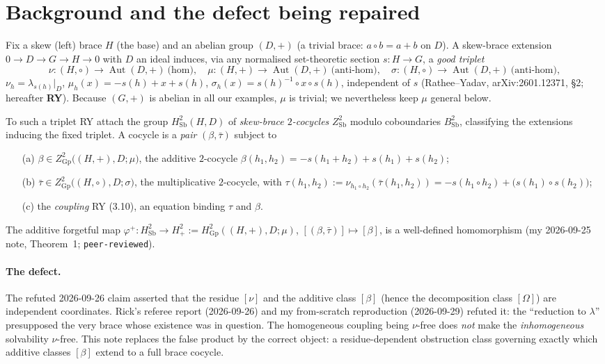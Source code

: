 \documentclass[11pt]{article}
\theoremstyle{definition}
\newcommand{\Sb}{\mathrm{Sb}}
\newcommand{\Gp}{\mathrm{Gp}}
\newcommand{\Aut}{\operatorname{Aut}}
\begin{document}
\section{Background and the defect being repaired}\label{sec:setup}

Fix a skew (left) brace $H$ (the base) and an abelian group $(D,+)$ (a trivial brace:
$a\circ b=a+b$ on $D$). A skew-brace extension $0\to D\to G\to H\to 0$ with $D$ an ideal
induces, via any normalised set-theoretic section $s:H\to G$, a \emph{good triplet}
\[
\nu:(H,\circ)\to\Aut(D,+)\ \text{(hom)},\quad
\mu:(H,+)\to\Aut(D,+)\ \text{(anti-hom)},\quad
\sigma:(H,\circ)\to\Aut(D,+)\ \text{(anti-hom)},
\]
$\nu_h=\lambda_{s(h)}|_D$, $\mu_h(x)=-s(h)+x+s(h)$, $\sigma_h(x)=s(h)^{-1}\circ x\circ s(h)$,
independent of $s$ (Rathee--Yadav, arXiv:2601.12371, \S2; hereafter \textbf{RY}). Because
$(G,+)$ is abelian in all our examples, $\mu$ is trivial; we nevertheless keep $\mu$
general below.

To such a triplet RY attach the group $H^2_\Sb(H,D)$ of \emph{skew-brace $2$-cocycles}
$Z^2_\Sb$ modulo coboundaries $B^2_\Sb$, classifying the extensions inducing the fixed
triplet. A cocycle is a \emph{pair} $(\beta,\bar\tau)$ subject to
\begin{itemize}\itemsep1pt
\item[(a)] $\beta\in Z^2_\Gp\big((H,+),D;\mu\big)$, the additive $2$-cocycle
$\beta(h_1,h_2)=-s(h_1{+}h_2)+s(h_1)+s(h_2)$;
\item[(b)] $\bar\tau\in Z^2_\Gp\big((H,\circ),D;\sigma\big)$, the multiplicative
$2$-cocycle, with $\tau(h_1,h_2):=\nu_{h_1\circ h_2}(\bar\tau(h_1,h_2))=-s(h_1{\circ}h_2)+
\big(s(h_1)\circ s(h_2)\big)$;
\item[(c)] the \emph{coupling} RY (3.10), an equation binding $\tau$ and $\beta$.
\end{itemize}
The additive forgetful map $\varphi^+:H^2_\Sb\to H^2_+:=H^2_\Gp((H,+),D;\mu)$,
$[(\beta,\bar\tau)]\mapsto[\beta]$, is a well-defined homomorphism (my
2026-09-25 note, Theorem~1; \texttt{peer-reviewed}).

\paragraph{The defect.} The refuted 2026-09-26 claim asserted that the residue $[\nu]$ and
the additive class $[\beta]$ (hence the decomposition class $[\Omega]$) are independent
coordinates. Rick's referee report (2026-09-26) and my from-scratch reproduction
(2026-09-29) refuted it: the ``reduction to $\lambda$'' presupposed the very brace whose
existence was in question. The homogeneous coupling being $\nu$-free does \emph{not} make
the \emph{inhomogeneous} solvability $\nu$-free. This note replaces the false product by
the correct object: a residue-dependent obstruction class governing exactly which additive
classes $[\beta]$ extend to a full brace cocycle.
\end{document}

